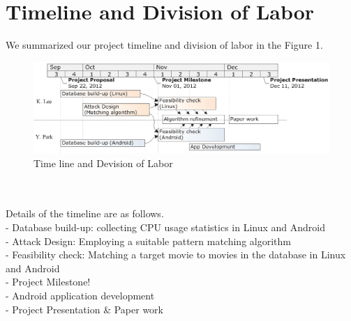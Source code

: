 \section{Timeline and Division of Labor}
\label{sec:timeline}
\indent We summarized our project timeline and division of labor in the Figure 1.\\
\vspace{-0.3in} 
\begin{figure}[!ht]
\centering
\includegraphics[scale=1]{Figures/Timeline}
\caption{Time line and Devision of Labor}
\end{figure}\\
\\Details of the timeline are as follows. \\
- Database build-up: collecting CPU usage statistics in Linux and Android\\
- Attack Design: Employing a suitable pattern matching algorithm\\
- Feasibility check: Matching a target movie to movies in the database in Linux and Android \\
- Project Milestone!\\
- Android application development\\
- Project Presentation \& Paper work
